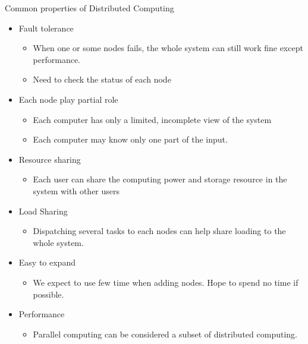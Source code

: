 \documentclass{SKP-beamer}
\begin{document}
\begin{frame}{Common properties of Distributed Computing}
	\begin{itemize}
		\item Fault tolerance
		\begin{itemize}
			\item  When one or some nodes fails, the whole system can still work fine except performance.
			\item Need to check the status of each node
		\end{itemize}
		\item Each node play partial role
		\begin{itemize}
			\item Each computer has only a limited, incomplete view of the system
			\item Each computer may know only one part of the input.
		\end{itemize}
		\item Resource sharing
		\begin{itemize}
			\item Each user can share the computing power and storage resource in the system with other 
			users
		\end{itemize}
		\item Load Sharing
			\begin{itemize}
			\item Dispatching several tasks to each nodes can help share loading to the whole system.
		\end{itemize}
		\item Easy to expand
		\begin{itemize}
			\item We expect to use few time when adding nodes. Hope to spend no time if possible.
		\end{itemize}
		\item Performance
		\begin{itemize}
			\item Parallel computing can be considered a subset of distributed computing.
		\end{itemize}
	\end{itemize}
	
\end{frame}
\end{document}
